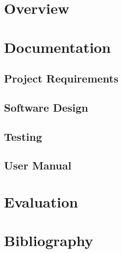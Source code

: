 \documentclass[letterpaper,12pt]{article}
\begin{document}
\section{Overview}

\section{Documentation}

\subsection{Project Requirements}

\subsection{Software Design}

\subsection{Testing}

\subsection{User Manual}

\section{Evaluation}

\section{Bibliography}
\end{document}
